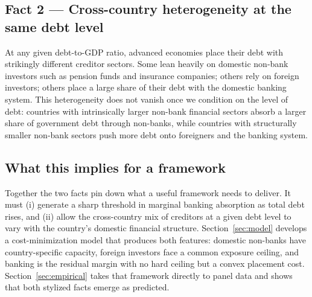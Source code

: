 \documentclass[\latexroot/\projectname]{subfiles}
\begin{document}
\subsection{Fact 2 — Cross-country heterogeneity at the same debt level}

At any given debt-to-GDP ratio, advanced economies place their debt
with strikingly different creditor sectors. Some lean heavily on
domestic non-bank investors such as pension funds and insurance
companies; others rely on foreign investors; others place a large
share of their debt with the domestic banking system. This
heterogeneity does not vanish once we condition on the level of debt:
countries with intrinsically larger non-bank financial sectors absorb
a larger share of government debt through non-banks, while countries
with structurally smaller non-bank sectors push more debt onto
foreigners and the banking system.

\subsection{What this implies for a framework}

Together the two facts pin down what a useful framework needs to
deliver. It must (i) generate a sharp threshold in marginal banking
absorption as total debt rises, and (ii) allow the cross-country mix
of creditors at a given debt level to vary with the country's domestic
financial structure. Section~\ref{sec:model} develops a
cost-minimization model that produces both features: domestic
non-banks have country-specific capacity, foreign investors face a
common exposure ceiling, and banking is the residual margin with no
hard ceiling but a convex placement cost. Section~\ref{sec:empirical}
takes that framework directly to panel data and shows that both
stylized facts emerge as predicted.

\smartbib
\end{document}
